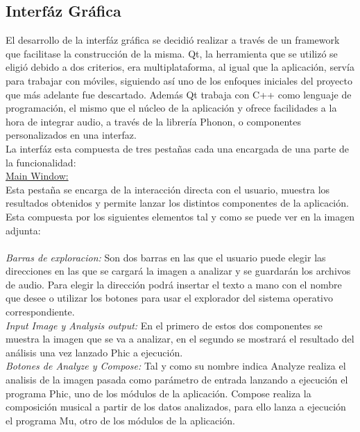 \subsection{Interfáz Gráfica}

El desarrollo de la interfáz gráfica se decidió realizar a través de un framework que facilitase la construcción de la misma. Qt, la herramienta que se utilizó se eligió debido a dos criterios, era multiplataforma, al igual que la aplicación, servía para trabajar con móviles, siguiendo así uno de los enfoques iniciales del proyecto que más adelante fue descartado. Además Qt trabaja con C++ como lenguaje de programación, el mismo que el núcleo de la aplicación y ofrece facilidades a la hora de integrar audio, a través de la librería Phonon, o componentes personalizados en una interfaz.\\
\newline
La interfáz esta compuesta de tres pestañas cada una encargada de una parte de la funcionalidad:
\newline
\\\underline{Main Window:}
\\Esta pestaña se encarga de la interacción directa con el usuario, muestra los resultados obtenidos y permite lanzar los distintos componentes de la aplicación. 
\\Esta compuesta por los siguientes elementos tal y como se puede ver en la imagen adjunta:
\\
\newline
\\\textit{Barras de exploracion:} Son dos barras en las que el usuario puede elegir las direcciones en las que se cargará la imagen a analizar y se guardarán los archivos de audio. Para elegir la dirección podrá insertar el texto a mano con el nombre que desee o utilizar los botones para usar el explorador del sistema operativo correspondiente.
\\\textit{Input Image y Analysis output:} En el primero de estos dos componentes se muestra la imagen que se va a analizar, en el segundo se mostrará el resultado del análisis una vez lanzado Phic a ejecución.
\\\textit{Botones de Analyze y Compose:} Tal y como su nombre indica Analyze realiza el analisis de la imagen pasada como parámetro de entrada lanzando a ejecución el programa Phic, uno de los módulos de la aplicación. Compose realiza la composición musical a partir de los datos analizados, para ello lanza a ejecución el programa Mu, otro de los módulos de la aplicación.
